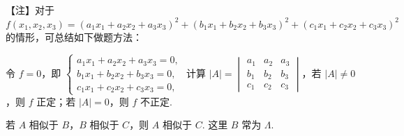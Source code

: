 

\begin{fnote}
【注】对于 $f(x_1,x_2,x_3)=(a_1x_1+a_2x_2+a_3x_3)^2+(b_1x_1+b_2x_2+b_3x_3)^2+(c_1x_1+c_2x_2+c_3x_3)^2$ 的情形，可总结如下做题方法：

令 $f=0$，即 $\begin{cases}a_1x_1+a_2x_2+a_3x_3=0,\\[2pt]b_1x_1+b_2x_2+b_3x_3=0,\\[2pt]c_1x_1+c_2x_2+c_3x_3=0,\end{cases}$ 计算 $|A|=\begin{vmatrix}a_1&a_2&a_3\\b_1&b_2&b_3\\c_1&c_2&c_3\end{vmatrix}$，若 $|A|\ne 0$，则 $f$ 正定；若 $|A|=0$，则 $f$ 不正定.
\end{fnote}



若 $A$ 相似于 $B$，$B$ 相似于 $C$，则 $A$ 相似于 $C$. 这里 $B$ 常为 $\Lambda$.

